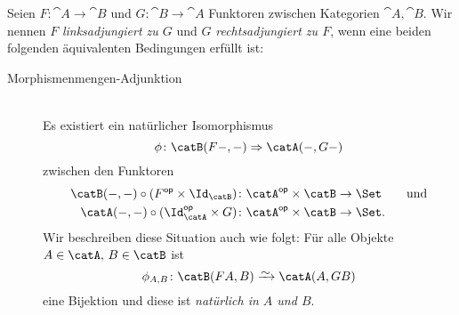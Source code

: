 \begin{thErinnerDef}
    \label{ch1:def:adjunktion}
    Seien $F\colon \cat A\to\cat B$ und $G\colon \cat B\to \cat A$
    Funktoren zwischen Kategorien $\cat A, \cat B$. Wir nennen
    $F$ \emph{linksadjungiert zu $G$} und $G$ \emph{rechtsadjungiert zu $F$},
    wenn eine beiden folgenden äquivalenten Bedingungen erfüllt ist:

    \begin{description}
        \item[Morphismenmengen-Adjunktion]\hfill\\
            Es existiert ein natürlicher Isomorphismus 
            \[ \phi\colon \catB(F\blank,\blank)
                \nattrafoto \catA(\blank,G\blank)
            \]
            zwischen den Funktoren
            \begin{align*}
                \catB(\blank,\blank)\after(F\op\times\Id_\catB)&\colon
                \catA\op\times\catB\to\Set 
                \qquad\text{und}\\
                \catA(\blank,\blank)\after(\Id_\catA\op\times G)&\colon
                \catA\op\times\catB\to\Set
            . \end{align*}
            Wir beschreiben diese Situation auch wie folgt: Für alle Objekte
            $A\in\catA,\,B\in\catB$ ist
            \[ \phi_{A,B}\colon \catB(FA,B)\isorightarrow\catA(A,GB) \] 
            eine Bijektion und diese ist \emph{natürlich in $A$ und $B$}.


\end{description}
\end{thErinnerDef}
